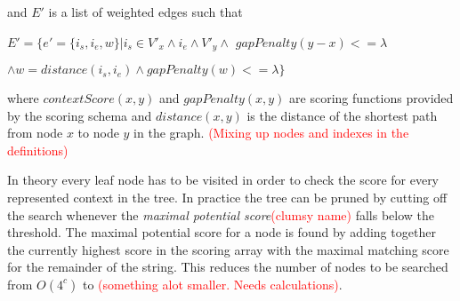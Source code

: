 \documentclass{article}
\begin{document}
\par\noindent
and $E'$ is a list of weighted edges such that\\
\par
$E'=\{e'=\{i_s, i_e, w\}|i_s \in V'_x \wedge i_e \wedge V'_y \wedge$ $gapPenalty(y - x) <= \lambda$\par$ \wedge w=distance(i_s, i_e) \wedge gapPenalty(w) <= \lambda\}$\\
\par\noindent
where $contextScore(x, y)$ and $gapPenalty(x, y)$ are scoring functions provided by the scoring schema and $distance(x, y)$ is the distance of the shortest path from node $x$ to node $y$ in the graph. \textcolor{red}{(Mixing up nodes and indexes in the definitions)}\\
\par\noindent
In theory every leaf node has to be visited in order to check the score for every represented context in the tree. In practice the tree can be pruned by cutting off the search whenever the \textit{maximal potential score}\textcolor{red}{(clumsy name)} falls below the threshold. The maximal potential score for a node is found by adding together the currently highest score in the scoring array with the maximal matching score for the remainder of the string. This reduces the number of nodes to be searched from $O(4^c)$ to \textcolor{red}{(something alot smaller. Needs calculations)}.\\
\end{document}
